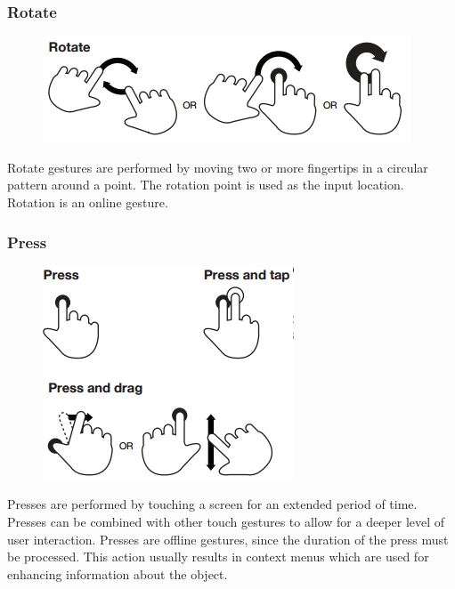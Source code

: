 \documentclass[11pt]{report}
\begin{document}
\subsubsection{Rotate}

\begin{figure}
\includegraphics[width=\textwidth]{Rotate}
\end{figure}

Rotate gestures are performed by moving two or more fingertips in a circular pattern around a point. The rotation point is used as the input location.
Rotation is an online gesture.

\subsubsection{Press}

\begin{figure}
\includegraphics[width=\textwidth]{Presses}
\end{figure}

Presses are performed by touching a screen for an extended period of time. 
Presses can be combined with other touch gestures to allow for a deeper level of user interaction.
Presses are offline gestures, since the duration of the press must be processed.
This action usually results in context menus which are used for enhancing information about the object.
\end{document}
